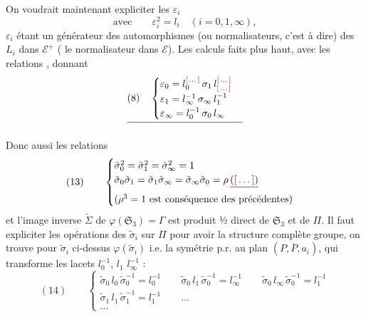 \documentclass[11pt,a4paper]{article}
\begin{document}

On voudrait maintenant expliciter les $\varepsilon_i$
\[
\text{avec} \qquad \varepsilon_i^2 = l_i \quad (i = 0, 1, \infty),
\]
$\varepsilon_i$ étant  un générateur des automorphismes (ou
normalisateurs, c'est à dire) des $L_i$ dans $\mathcal{E}^{+}$
( le normalisateur dans $\mathcal{E}$). Les calculs faits plus
haut, avec les relations , donnant
\[
\struck{(8) \quad
\begin{cases}
\varepsilon_0 = l_0^{\ill{}}\, \sigma_1\, l_{\ill{}}^{\ill{}} \\
\varepsilon_1 = l_\infty^{-1}\, \sigma_\infty\, l_1^{-1} \\
\varepsilon_\infty = l_0^{-1}\, \sigma_0\, l_\infty
\end{cases}}
\]





Donc aussi les relations
\[
(13) \qquad
\begin{cases}
\tilde\sigma_0^2 = \tilde\sigma_1^2 = \tilde\sigma_\infty^2 = 1 \\
\tilde\sigma_0\tilde\sigma_1 = \tilde\sigma_1\tilde\sigma_\infty = \tilde\sigma_\infty\tilde\sigma_0 = \rho\, \struck{(\ill{})} \\
(\rho^3 = 1 \text{ est conséquence des précédentes})
\end{cases}
\]
et l'image inverse $\widetilde{\Sigma}$ de $\varphi(\mathfrak{S}_3) = \Gamma$
 est produit ½ direct de $\mathfrak{S}_3$ et de
$\Pi$. Il faut expliciter les opérations des $\tilde\sigma_i$ sur $\Pi$ pour
avoir la structure complète  groupe, on trouve pour
$\tilde\sigma_i$ ci-dessus $\varphi(\tilde\sigma_i)$ i.e. la symétrie p.r. au
plan $(P, \overline{P}, a_i)$, qui transforme les lacets
$l_0^{-1}$, \struck{\ill{}} $l_1$  $l_\infty^{-1}$
\struck{\ill{}} :
\[
(14) \qquad
\begin{cases}
\tilde\sigma_0\, l_0\, \tilde\sigma_0^{-1} = l_0^{-1} \qquad
\tilde\sigma_0\, l_1\, \tilde\sigma_0^{-1} = l_\infty^{-1} \qquad
\tilde\sigma_0\, l_\infty\, \tilde\sigma_0^{-1} = l_1^{-1} \\
\tilde\sigma_1\, l_1\, \tilde\sigma_1^{-1} = l_1^{-1} \qquad \ldots \\
\ldots
\end{cases}
\]
\end{document}
